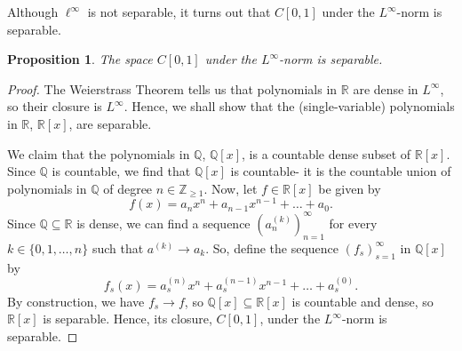 \documentclass[a4paper, openany]{memoir}
\theoremstyle{definition}
\theoremstyle{plain}
\newtheorem{proposition}[definition]{Proposition}
\begin{document}
    Although $\ell^\infty$ is not separable, it turns out that $C[0, 1]$ under the $L^\infty$-norm is separable.
    \begin{proposition}
        The space $C[0, 1]$ under the $L^\infty$-norm is separable.
    \end{proposition}
    \begin{proof}
        The Weierstrass Theorem tells us that polynomials in $\mathbb{R}$ are dense in $L^\infty$, so their closure is $L^\infty$. Hence, we shall show that the (single-variable) polynomials in $\mathbb{R}$, $\mathbb{R}[x]$, are separable.

        We claim that the polynomials in $\mathbb{Q}$, $\mathbb{Q}[x]$, is a countable dense subset of $\mathbb{R}[x]$. Since $\mathbb{Q}$ is countable, we find that $\mathbb{Q}[x]$ is countable- it is the countable union of polynomials in $\mathbb{Q}$ of degree $n \in \mathbb{Z}_{\geq 1}$. Now, let $f \in \mathbb{R}[x]$ be given by
        \[f(x) = a_n x^n + a_{n-1} x^{n-1} + \dots + a_0.\]
        Since $\mathbb{Q} \subseteq \mathbb{R}$ is dense, we can find a sequence $(a^{(k)}_n)_{n=1}^\infty$ for every $k \in \{0, 1, \dots, n\}$ such that $a^{(k)} \to a_k$. So, define the sequence $(f_s)_{s=1}^\infty$ in $\mathbb{Q}[x]$ by
        \[f_s(x) = a^{(n)}_s x^n + a^{(n-1)}_s x^{n-1} + \dots + a^{(0)}_s.\]
        By construction, we have $f_s \to f$, so $\mathbb{Q}[x] \subseteq \mathbb{R}[x]$ is countable and dense, so $\mathbb{R}[x]$ is separable. Hence, its closure, $C[0, 1]$, under the $L^\infty$-norm is separable.
    \end{proof}
    \newpage
\end{document}
